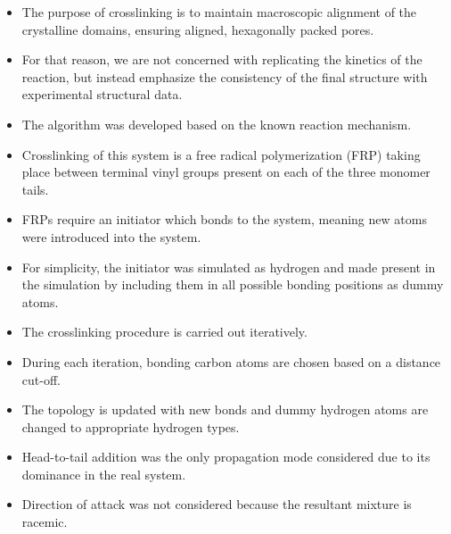 \documentclass{article}
\newcommand{\angstrom}{\textup{\AA}}
\begin{document}
  \begin{itemize}
    \item The purpose of crosslinking is to maintain macroscopic alignment of
    the crystalline domains, ensuring aligned, hexagonally packed pores.
    \item For that reason, we are not concerned with replicating the kinetics
    of the reaction, but instead emphasize the consistency of the final structure
    with experimental structural data.
    \item The algorithm was developed based on the known reaction mechanism.
    \item Crosslinking of this system is a free radical polymerization (FRP)
    taking place between terminal vinyl groups present on each of the three
    monomer tails.
    \item FRPs require an initiator which bonds to the system, meaning new atoms
    were introduced into the system.
    \item For simplicity, the initiator was simulated as hydrogen and made present
    in the simulation by including them in all possible bonding positions as dummy atoms.
    \item The crosslinking procedure is carried out iteratively.
    \item During each iteration, bonding carbon atoms are chosen based on a distance cut-off.
    \item The topology is updated with new bonds and dummy hydrogen atoms are
    changed to appropriate hydrogen types.
    \item Head-to-tail addition was the only propagation mode considered due to
    its dominance in the real system.
    \item Direction of attack was not considered because the resultant mixture
    is racemic.
  \end{itemize}
\end{document}

